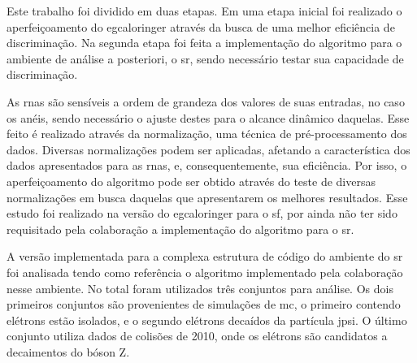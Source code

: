 Este trabalho foi dividido em duas etapas. Em uma etapa inicial 
foi realizado o aperfeiçoamento do \gls{egcaloringer} através da busca de uma
melhor eficiência de discriminação. Na segunda etapa foi feita a implementação 
do algoritmo para o ambiente de análise a posteriori, o \glsdesc{sr}, sendo
necessário testar sua capacidade de discriminação. 

As \glspl{rna} são sensíveis a ordem de grandeza dos valores de suas
entradas, no caso os anéis, sendo necessário o ajuste destes para o
alcance dinâmico daquelas. Esse feito é realizado através da normalização, uma técnica de
pré-processamento dos dados. Diversas normalizações podem ser
aplicadas, afetando a característica dos dados apresentados para as \glspl{rna},
e, consequentemente, sua eficiência. Por isso, o aperfeiçoamento do algoritmo
pode ser obtido através do teste de diversas normalizações em busca daquelas que apresentarem
os melhores resultados. Esse estudo foi realizado na versão do \gls{egcaloringer}
para o \glsdesc{sf}, por ainda não ter sido requisitado pela colaboração a
implementação do algoritmo para o \glsdesc{sr}.

A versão implementada para a complexa estrutura de código do
ambiente do \glsdesc{sr} foi analisada tendo como referência o algoritmo
implementado pela colaboração nesse ambiente. No total 
foram utilizados três conjuntos para análise. Os dois primeiros conjuntos são
provenientes de simulações de \acrlong{mc}, o primeiro contendo elétrons estão
isolados, e o segundo elétrons decaídos da partícula \acrshort{jpsi}. O último
conjunto utiliza dados de colisões de 2010, onde os elétrons são candidatos a
decaimentos do bóson Z.

